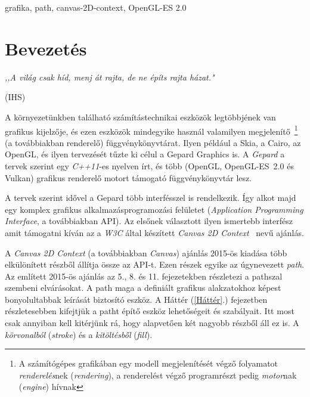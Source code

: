 \documentclass[12pt]{report}
\theoremstyle{definition}
\newcommand{\inenglish}[1]{\textsl{#1}}
\newcommand{\inenglishfn}[1]{\footnotesize{\inenglish{#1}}}
\begin{document}
grafika, path, canvas-2D-context, OpenGL-ES 2.0



    \chapter*{Bevezetés}
    \label{Bevezetés}

    {
    \setlength\epigraphrule{0pt}
    \linespread{1.0}\epigraph{\small\emph{,,A világ csak híd, menj át rajta,
    de ne építs rajta házat."}}{\small(IHS)}
    }

  A környezetünkben található számítástechnikai eszközök
legtöbbjének van grafikus kijelzője, és ezen eszközök mindegyike használ
valamilyen megjelenítő~\footnote{A számítógépes grafikában egy modell
megjelenítését végző folyamatot \emph{renderelés}nek (\inenglishfn{rendering}),
a renderelést végző programrészt pedig \emph{motor}nak (\inenglishfn{engine})
hívnak} (a továbbiakban renderelő) függvénykönyvtárat. Ilyen például a Skia, a
Cairo, az OpenGL, és ilyen tervezését tűzte ki célul a Gepard Graphics is. A
\emph{Gepard} a tervek szerint egy \emph{C++11}-es nyelven írt, és több
(OpenGL, \mbox{OpenGL-ES 2.0\cite{Munshi:2008:OEP:1481069}} és Vulkan) grafikus
renderelő motort támogató függvénykönyvtár lesz.

  A tervek szerint idővel a Gepard több interfésszel is rendelkezik.
Így alkot majd egy komplex grafikus alkalmazásprogramozási felületet
(\inenglish{Application Programming Interface}, a továbbiakban API). Az elsőnek
választott ilyen ismertebb interfész amit támogatni kíván az a \emph{W3C} által
készített \emph{Canvas 2D Context}~\cite{Cabanier:14:HCC} nevű ajánlás.

  A \emph{Canvas 2D Context} (a továbbiakban \emph{Canvas}) ajánlás
2015-ös kiadása több elkülönített részből állítja össze az API-t. Ezen részek
egyike az úgynevezett \emph{path}. Az említett 2015-ös ajánlás az 5., 8. és 11.
fejezetekben részletezi a pathszal szembeni elvárásokat. A path maga a
definiált grafikus alakzatokhoz képest bonyolultabbak leírását biztosító
eszköz. A Háttér (\ref{Háttér}.) fejezetben részletesebben kifejtjük a patht
építő eszköz lehetőségeit és szabályait. Itt most csak annyiban kell kitérjünk
rá, hogy alapvetően két nagyobb részből áll ez is. A \emph{körvonalból}
(\inenglish{stroke}) és a \emph{kitöltésből} (\inenglish{fill}).
\end{document}
